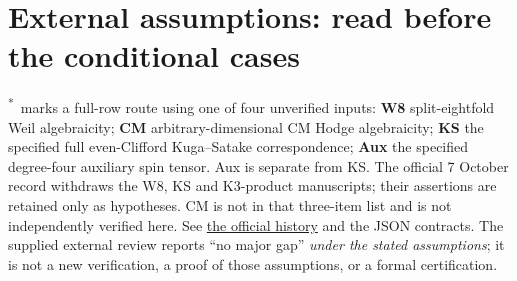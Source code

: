 \documentclass[10pt,a4paper]{article}
\newcommand{\external}{\textcolor{Warn}{\textsuperscript{*}}}
\begin{document}
\section*{External assumptions: read before the conditional cases}
\external\ marks a full-row route using one of four unverified inputs: \textbf{W8} split-eightfold Weil algebraicity; \textbf{CM} arbitrary-dimensional CM Hodge algebraicity; \textbf{KS} the specified full even-Clifford Kuga--Satake correspondence; \textbf{Aux} the specified degree-four auxiliary spin tensor. Aux is separate from KS. The official 7 October record withdraws the W8, KS and K3-product manuscripts; their assertions are retained only as hypotheses. CM is not in that three-item list and is not independently verified here. See \href{https://github.com/openai/math/blob/main/history.md}{the official history} and the JSON contracts.
The supplied external review reports ``no major gap'' \emph{under the stated assumptions}; it is not a new verification, a proof of those assumptions, or a formal certification.
\newpage
\end{document}
